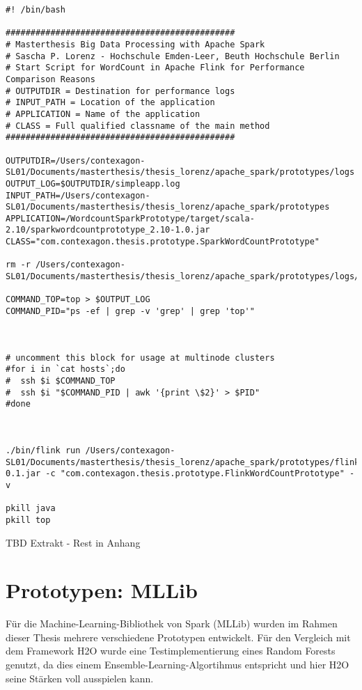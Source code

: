 \begin{lstlisting}[label=shellflink,caption=Shellscript zum Start des Flink WordCountPrototyp]
#! /bin/bash

##############################################
# Masterthesis Big Data Processing with Apache Spark
# Sascha P. Lorenz - Hochschule Emden-Leer, Beuth Hochschule Berlin
# Start Script for WordCount in Apache Flink for Performance Comparison Reasons	
# OUTPUTDIR = Destination for performance logs
# INPUT_PATH = Location of the application 
# APPLICATION = Name of the application
# CLASS = Full qualified classname of the main method
##############################################

OUTPUTDIR=/Users/contexagon-SL01/Documents/masterthesis/thesis_lorenz/apache_spark/prototypes/logs
OUTPUT_LOG=$OUTPUTDIR/simpleapp.log
INPUT_PATH=/Users/contexagon-SL01/Documents/masterthesis/thesis_lorenz/apache_spark/prototypes
APPLICATION=/WordcountSparkPrototype/target/scala-2.10/sparkwordcountprototype_2.10-1.0.jar
CLASS="com.contexagon.thesis.prototype.SparkWordCountPrototype"

rm -r /Users/contexagon-SL01/Documents/masterthesis/thesis_lorenz/apache_spark/prototypes/logs/flinkOutput.out

COMMAND_TOP=top > $OUTPUT_LOG
COMMAND_PID="ps -ef | grep -v 'grep' | grep 'top'"



# uncomment this block for usage at multinode clusters
#for i in `cat hosts`;do
#  ssh $i $COMMAND_TOP
#  ssh $i "$COMMAND_PID | awk '{print \$2}' > $PID"
#done



./bin/flink run /Users/contexagon-SL01/Documents/masterthesis/thesis_lorenz/apache_spark/prototypes/flink_tests/WordCountPrototypeFlink/target/WordCountFlinkPrototype-0.1.jar -c "com.contexagon.thesis.prototype.FlinkWordCountPrototype" -v

pkill java
pkill top
\end{lstlisting}

TBD Extrakt - Rest in Anhang

\section{Prototypen: MLLib }
\label{section:prototyp mllib}

Für die Machine-Learning-Bibliothek von Spark (MLLib) wurden im Rahmen dieser Thesis mehrere verschiedene Prototypen entwickelt. Für den Vergleich mit dem Framework H2O wurde eine Testimplementierung eines Random Forests genutzt, da dies einem Ensemble-Learning-Algortihmus entspricht und hier H2O seine Stärken voll ausspielen kann. 

